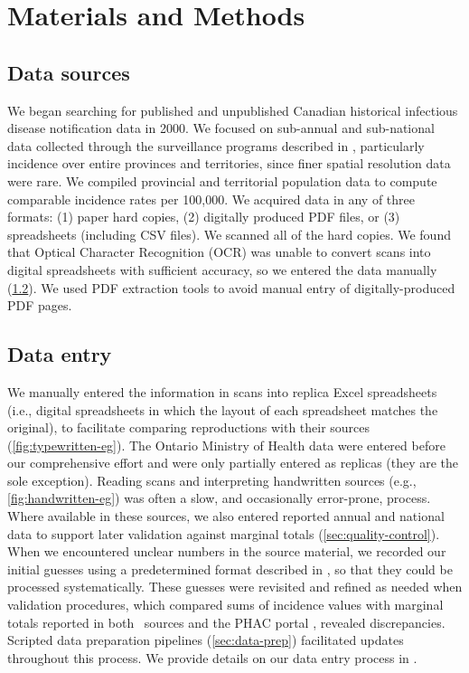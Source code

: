 \documentclass[12pt]{article}
\begin{document}
\section{Materials and Methods}\label{sec:methods}

\subsection{Data sources}\label{sec:data-sources}

We began searching for published and unpublished Canadian historical infectious disease notification data in 2000. We focused on sub-annual and sub-national data collected through the surveillance programs described in , particularly incidence over entire provinces and territories, since finer spatial resolution data were rare. We compiled provincial and territorial population data \cite{canada1925sixth,statistics1973population,statcan2021population} to compute comparable incidence rates per 100,000. We acquired data in any of three formats: (1) paper hard copies, (2) digitally produced PDF files, or (3) spreadsheets (including CSV files). We scanned all of the hard copies. We found that Optical Character Recognition (OCR) was unable to convert scans into digital spreadsheets with sufficient accuracy, so we entered the data manually (\cref{sec:data-entry}). We used PDF extraction tools \cite{PDFTables} to avoid manual entry of digitally-produced PDF pages.

\subsection{Data entry}\label{sec:data-entry}

We manually entered the information in scans into replica Excel spreadsheets (i.e., digital spreadsheets in which the layout of each spreadsheet matches the original), to facilitate comparing reproductions with their sources (\cref{fig:typewritten-eg}). The Ontario Ministry of Health data were entered before our comprehensive effort and were only partially entered as replicas (they are the sole exception). Reading scans and interpreting handwritten sources (e.g., \cref{fig:handwritten-eg}) was often a slow, and occasionally error-prone, process. Where available in these sources, we also entered reported annual and national data to support later validation against marginal totals (\cref{sec:quality-control}). When we encountered unclear numbers in the source material, we recorded our initial guesses using a predetermined format described in , so that they could be processed systematically. These guesses were revisited and refined as needed when validation procedures, which compared sums of incidence values with marginal totals reported in both \datacronym\ sources and the PHAC portal \cite{totten2019updates}, revealed discrepancies. Scripted data preparation pipelines (\cref{sec:data-prep}) facilitated updates throughout this process. We provide details on our data entry process in .
\end{document}
